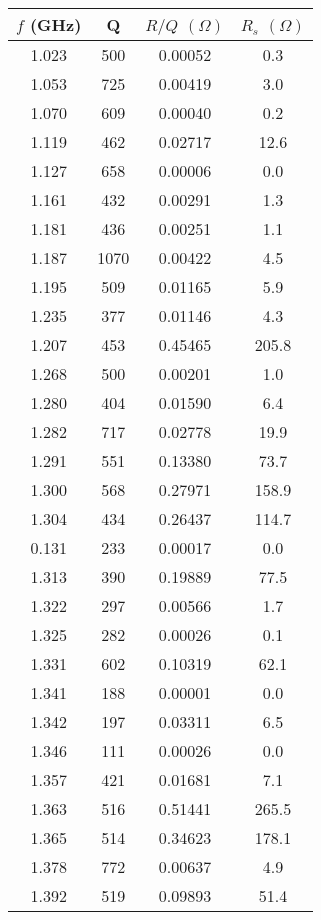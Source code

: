\begin{longtable}{c | c | c | c} 
\endfirsthead$f$ (GHz) & Q & $R/Q$ $(\Omega)$ & $R_{s}$ $(\Omega)$ \\
              \endhead1.023 &  500 & 0.00052 &  0.3 \\ \hline 
1.053 &  725 & 0.00419 &  3.0 \\ \hline 
1.070 &  609 & 0.00040 &  0.2 \\ \hline 
1.119 &  462 & 0.02717 & 12.6 \\ \hline 
1.127 &  658 & 0.00006 &  0.0 \\ \hline 
1.161 &  432 & 0.00291 &  1.3 \\ \hline 
1.181 &  436 & 0.00251 &  1.1 \\ \hline 
1.187 & 1070 & 0.00422 &  4.5 \\ \hline 
1.195 &  509 & 0.01165 &  5.9 \\ \hline 
1.235 &  377 & 0.01146 &  4.3 \\ \hline 
1.207 &  453 & 0.45465 & 205.8 \\ \hline 
1.268 &  500 & 0.00201 &  1.0 \\ \hline 
1.280 &  404 & 0.01590 &  6.4 \\ \hline 
1.282 &  717 & 0.02778 & 19.9 \\ \hline 
1.291 &  551 & 0.13380 & 73.7 \\ \hline 
1.300 &  568 & 0.27971 & 158.9 \\ \hline 
1.304 &  434 & 0.26437 & 114.7 \\ \hline 
0.131 &  233 & 0.00017 &  0.0 \\ \hline 
1.313 &  390 & 0.19889 & 77.5 \\ \hline 
1.322 &  297 & 0.00566 &  1.7 \\ \hline 
1.325 &  282 & 0.00026 &  0.1 \\ \hline 
1.331 &  602 & 0.10319 & 62.1 \\ \hline 
1.341 &  188 & 0.00001 &  0.0 \\ \hline 
1.342 &  197 & 0.03311 &  6.5 \\ \hline 
1.346 &  111 & 0.00026 &  0.0 \\ \hline 
1.357 &  421 & 0.01681 &  7.1 \\ \hline 
1.363 &  516 & 0.51441 & 265.5 \\ \hline 
1.365 &  514 & 0.34623 & 178.1 \\ \hline 
1.378 &  772 & 0.00637 &  4.9 \\ \hline 
1.392 &  519 & 0.09893 & 51.4 \\ \hline 

\end{longtable}
